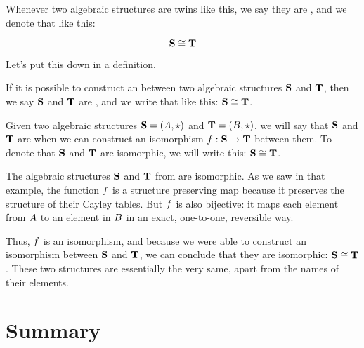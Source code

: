 \documentclass[../../../main.tex]{subfiles}
\begin{document}
Whenever two algebraic structures are twins like this, we say they are , and we denote that like this:

\begin{equation*}
  \algebra{S} \isomorphic/ \algebra{T}
\end{equation*}

Let's put this down in a definition.

\begin{terminology}
  If it is possible to construct an  between two algebraic structures $\mathbf{S}$ and $\mathbf{T}$, then we say $\mathbf{S}$ and $\mathbf{T}$ are , and we write that like this: $\algebra{S} \isomorphic/ \algebra{T}$.
\end{terminology}

\begin{fdefinition}
  \label{def:isomorphic-algebraic-structures}
  Given two algebraic structures $\algebra{S} = (\set{A}, \opSymbol/)$ and $\algebra{T} = (\set{B}, \opSymbol/)$, we will say that $\mathbf{S}$ and $\mathbf{T}$ are  when we can construct an isomorphism $f: \mathbf{S} \rightarrow \mathbf{T}$ between them. To denote that $\mathbf{S}$ and $\mathbf{T}$ are isomorphic, we will write this: $\algebra{S} \isomorphic/ \algebra{T}$.
\end{fdefinition}

\begin{example}

The algebraic structures $\mathbf{S}$ and $\mathbf{T}$ from  are isomorphic. As we saw in that example, the function $f$ is a structure preserving map because it preserves the structure of their Cayley tables. But $f$ is also bijective: it maps each element from $A$ to an element in $B$ in an exact, one-to-one, reversible way. 

Thus, $f$ is an isomorphism, and because we were able to construct an isomorphism between $\mathbf{S}$ and $\mathbf{T}$, we can conclude that they are isomorphic: $\algebra{S} \isomorphic/ \algebra{T}$. These two structures are essentially the very same, apart from the names of their elements.

\end{example}


\section{Summary}
\end{document}
